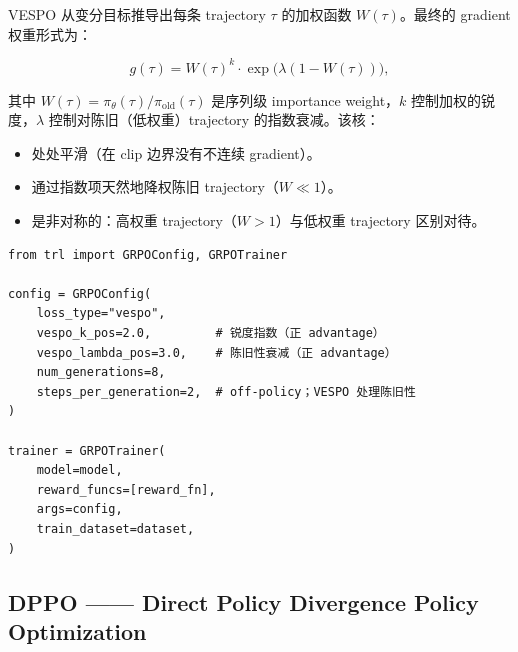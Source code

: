 VESPO 从变分目标推导出每条 trajectory $\tau$ 的加权函数 $W(\tau)$。最终的 gradient 权重形式为：

\[
\boxed{
    g(\tau) = W(\tau)^k \cdot \exp\!\bigl(\lambda(1 - W(\tau))\bigr),
  }
\]

其中 $W(\tau) = \pi_\theta(\tau)/\pi_{\text{old}}(\tau)$ 是序列级 importance weight，$k$ 控制加权的锐度，$\lambda$ 控制对陈旧（低权重）trajectory 的指数衰减。该核：

\begin{itemize}
  \item 处处平滑（在 clip 边界没有不连续 gradient）。
  \item 通过指数项天然地降权陈旧 trajectory（$W \ll 1$）。
  \item 是非对称的：高权重 trajectory（$W > 1$）与低权重 trajectory 区别对待。
\end{itemize}

\begin{examplebox}
\begin{lstlisting}[style=pythonstyle]
from trl import GRPOConfig, GRPOTrainer

config = GRPOConfig(
    loss_type="vespo",
    vespo_k_pos=2.0,         # 锐度指数（正 advantage）
    vespo_lambda_pos=3.0,    # 陈旧性衰减（正 advantage）
    num_generations=8,
    steps_per_generation=2,  # off-policy；VESPO 处理陈旧性
)

trainer = GRPOTrainer(
    model=model,
    reward_funcs=[reward_fn],
    args=config,
    train_dataset=dataset,
)
\end{lstlisting}
\end{examplebox}

\subsection{DPPO —— Direct Policy Divergence Policy Optimization}
\label{sec:dppo}

